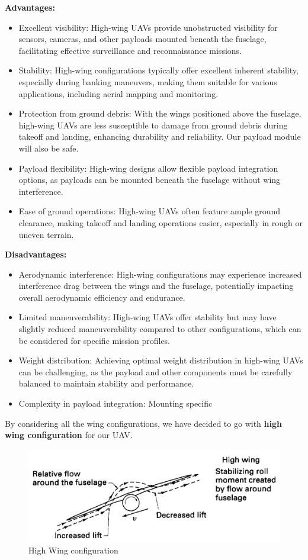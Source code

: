 \documentclass[12 pt]{article}
\begin{document}
{\color{black}
\textbf{{Advantages:}}
\begin{itemize}
  \item Excellent visibility: High-wing UAVs provide unobstructed visibility for sensors, cameras, and other payloads mounted beneath the fuselage, facilitating effective surveillance and reconnaissance missions.
  \item Stability: High-wing configurations typically offer excellent inherent stability, especially during banking maneuvers, making them suitable for various applications, including aerial mapping and monitoring.
  \item Protection from ground debris: With the wings positioned above the fuselage, high-wing UAVs are less susceptible to damage from ground debris during takeoff and landing, enhancing durability and reliability. Our payload module will also be safe.
  \item Payload flexibility: High-wing designs allow flexible payload integration options, as payloads can be mounted beneath the fuselage without wing interference.
  \item Ease of ground operations: High-wing UAVs often feature ample ground clearance, making takeoff and landing operations easier, especially in rough or uneven terrain.
\end{itemize}

\textbf{{Disadvantages:}}
\begin{itemize}
  \item Aerodynamic interference: High-wing configurations may experience increased interference drag between the wings and the fuselage, potentially impacting overall aerodynamic efficiency and endurance.
  \item Limited maneuverability: High-wing UAVs offer stability but may have slightly reduced maneuverability compared to other configurations, which can be considered for specific mission profiles.
  \item Weight distribution: Achieving optimal weight distribution in high-wing UAVs can be challenging, as the payload and other components must be carefully balanced to maintain stability and performance.
  \item Complexity in payload integration: Mounting specific
\end{itemize}
\vspace{5mm} 
By considering all the wing configurations, we have decided to go with\textbf{ high wing configuration} for our UAV.
\begin{figure}[H]
    \centering
    \includegraphics[width=\linewidth]{Codes/Week 6/wing configuration.jpeg}
    \caption{High Wing configuration}
    \label{High Wing configuration}
\end{figure}

}
\end{document}
